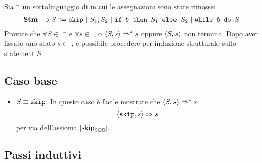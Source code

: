 \newcommand{\stmm}{\stm$^{-}$}

{Sia \stmm{} un sottolinguaggio di \stm{} in cui le assegnazioni sono state
rimosse:
\begin{align*}
\mbox{\stmm} \ni{} S \Coloneqq{}  \skipForFriends\ | \ 
                                  S_1; S_2\ | \ 
                                  \ifABC{b}{S_1}{S_2}\ | \ 
                                  \wbS{b}{S}
\end{align*}
Provare che $\forall{S} \in$ \stmm{} e $\forall{s} \in$ \states, o
$\langle{}S, s\rangle{} \Rightarrow^{*} s$ oppure $\langle{}S, s\rangle{}$ non termina.
}
{}
Dopo aver fissato uno stato $s \in$ \states, è possibile procedere per
induzione strutturale sullo statement $S$.

\subsection{Caso base}

\begin{itemize}
  \item $S \equiv{} \textrm{\normalfont{\texttt{skip}}}$. In questo caso è facile mostrare che
    $\langle{}S, s\rangle{} \Rightarrow^{*} s$:
$$
\langle{}\textrm{\normalfont{\texttt{skip}}}, s\rangle{} \Rightarrow^{} s
$$
per via dell'assioma $ [ \textrm{\normalfont{skip}} ^ \textrm{\normalfont{}} _\textrm{\normalfont{SOS}} ] $.
\end{itemize}

\subsection{Passi induttivi}

